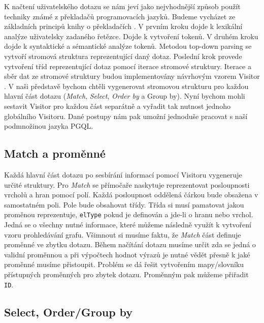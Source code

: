 K načtení uživatelského dotazu se nám jeví jako nejvhodnější způsob použít techniky známé z překladačů programovacích jazyků.
Budeme vycházet ze základních principů knihy o překladačích \citep{dragonBook}.
V prvním kroku dojde k lexikální analýze uživatelsky zadaného řetězce.
Dojde k vytvoření tokenů.
V druhém kroku dojde k syntaktické a sémantické analýze tokenů.
Metodou top-down parsing \citep[str. 217]{dragonBook} se vytvoří stromová struktura reprezentující daný dotaz.
Poslední krok provede vytvoření tříd reprezentující dotaz pomocí iterace stromové struktury.
Iterace a sběr dat ze stromové struktury budou implementovány návrhovým vzorem Visitor \citep[str. 331]{patterns}.
V naši představě bychom chtěli vygenerovat stromovou strukturu pro každou hlavní část dotazu (\textit{Match}, \textit{Select}, \textit{Order by} a Group by).
Nyní bychom mohli sestavit Visitor pro každou část separátně a vyřadit tak nutnost jednoho globálního Visitoru.
Dané postupy nám pak umožní jednoduše pracovat s naší podmnožinou jazyka PGQL.

\subsection{Match a proměnné} \label{anal.mathcandvar}

Každá hlavní část dotazu po sesbírání informací pomocí Visitoru vygeneruje určité struktury.
Pro \textit{Match} se přímočaře naskytuje reprezentovat posloupnosti vrcholů a hran pomocí polí.
Každá posloupnost oddělená čárkou bude obsažena v samostatném poli.
Pole bude obsahovat třídy.
Třída si musí pamatovat jakou proměnou reprezentuje, \verb+elType+ pokud je definován a jde-li o hranu nebo vrchol.
Jedná se o všechny nutné informace, které můžeme následně využít k vytvoření vzoru prohledávání grafu.
Všimnout si musíme faktu, že \textit{Match} část definuje proměnné ve zbytku dotazu.
Během načítání dotazu musíme určit zda se jedná o validní proměnnou a při výpočtech hodnot výrazů je nutné vědět přesně k jaké proměnné musíme přistoupit.
Problém se dá řešit vytvořením mapy/slovníku přístupných proměnných pro zbytek dotazu.
Proměnným pak můžeme přiřadit \verb+ID+.

\subsection{Select, Order/Group by}

